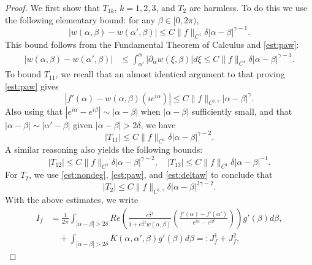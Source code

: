 \documentclass[11pt,reqno]{amsproc}
\newcommand{\p}{\partial}
\newcommand{\palpha}{\p_\alpha}
\begin{document}
\begin{proof}
    We first show that $T_{1k}$, $k = 1,2,3$, and $T_2$ are harmless. To do this we use the following elementary bound: for any $\beta \in [0,2\pi)$,
    \begin{equation}
        \label{est:deltaw}
        |w(\alpha,\beta) - w(\alpha',\beta)| \le C\|f\|_{C^1} \delta |\alpha - \beta|^{\gamma-1}.
    \end{equation}
    This bound follows from the Fundamental Theorem of Calculus and \eqref{est:paw}:
    \begin{align*}
        |w(\alpha,\beta) - w(\alpha',\beta)| &\le \int_{\alpha'}^\alpha |\palpha w(\xi,\beta)| d\xi \le C\|f\|_{C^1}\delta|\alpha - \beta|^{\gamma - 1}.
    \end{align*}
    To bound $T_{11}$, we recall that an almost identical argument to that proving \eqref{est:paw} gives 
    \begin{equation}\label{est:pawaux1}
    |f'(\alpha) - w(\alpha,\beta) (ie^{i\alpha})| \le C\|f\|_{C^{1,\gamma}} |\alpha - \beta|^\gamma.
    \end{equation}
    Also using that $|e^{i\alpha} - e^{i\beta}|\sim |\alpha - \beta|$ when $|\alpha - \beta|$ sufficiently small, and that $|\alpha - \beta| \sim |\alpha' - \beta|$ given $|\alpha - \beta| > 2\delta$, we have
    \begin{equation}
        \label{est:T11}
        |T_{11}| \le C\|f\|_{C^{1}} \delta |\alpha - \beta|^{\gamma-2}.
    \end{equation}
    A similar reasoning also yields the following bounds:
    \begin{equation}
        \label{est:T123}
        |T_{12}| \le C\|f\|_{C^{1}} \delta |\alpha - \beta|^{\gamma-2},\quad |T_{13}| \le C\|f\|_{C^{1}} \delta|\alpha - \beta|^{-1}.
    \end{equation}
    For $T_2$, we use \eqref{est:nondeg}, \eqref{est:paw}, and \eqref{est:deltaw} to conclude that
    \begin{equation}
        \label{est:T2}
        |T_2| \le C\|f\|_{C^{1,\gamma}} \delta |\alpha - \beta|^{2\gamma-2}.
    \end{equation}
    With the above estimates, we write
    \begin{align*}
        I_f &= \frac{1}{2\pi}\int_{|\alpha - \beta| > 2\delta}Re\left(\frac{e^{\frac{i}{2}t}}{1+ e^{\frac{i}{2}t}w(\alpha,\beta)}\left(\frac{f'(\alpha) - f'(\alpha')}{e^{i\alpha} - e^{i\beta}}\right)\right)g'(\beta) d\beta,\\
        &\quad + \int_{|\alpha - \beta| > 2\delta}\bar{K}(\alpha,\alpha',\beta)g'(\beta) d\beta =: J_f^1 + J_f^2,

\end{align*}
\end{proof}
\end{document}
